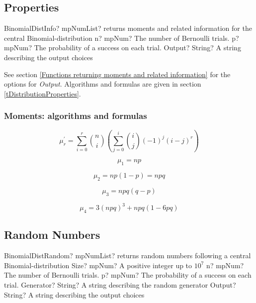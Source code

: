 \subsection{Properties}
\label{BinomialDistributionProperties}

\begin{mpFunctionsExtract}
	\mpFunctionThree
	{BinomialDistInfo? mpNumList? returns moments and related information for the central Binomial-distribution}
	{n? mpNum? The number of Bernoulli trials.}
	{p? mpNum? The probability of a success on each trial.}
	{Output? String? A string describing the output choices}
\end{mpFunctionsExtract}

\vspace{0.3cm}

See section \ref{Functions returning moments and related information} for the options for {\itshape\sffamily Output}. Algorithms and formulas are given in section \ref{tDistributionProperties}.



\subsubsection{Moments: algorithms and formulas}
\begin{equation} 
	\mu_r^{'} = \sum_{i=0}^r \binom{n}{i} \left(\sum_{j=0}^i \binom{i}{j} (-1)^j (i-j)^r\right)
\end{equation}

\begin{equation} 
	\mu_1 = np
\end{equation}

\begin{equation} 
	\mu_2 = np(1-p) = npq
\end{equation}

\begin{equation} 
	\mu_3 = npq(q-p)
\end{equation}

\begin{equation} 
	\mu_4 = 3(npq)^3 + npq(1-6pq)
\end{equation}





\subsection{Random Numbers}

\begin{mpFunctionsExtract}
	\mpFunctionFive
	{BinomialDistRandom? mpNumList? returns random numbers following a central Binomial-distribution}
	{Size? mpNum? A positive integer up to $10^7$}
	{n? mpNum? The number of Bernoulli trials.}
	{p? mpNum? The probability of a success on each trial.}
	{Generator? String? A string describing the random generator}
	{Output? String? A string describing the output choices}
\end{mpFunctionsExtract}

